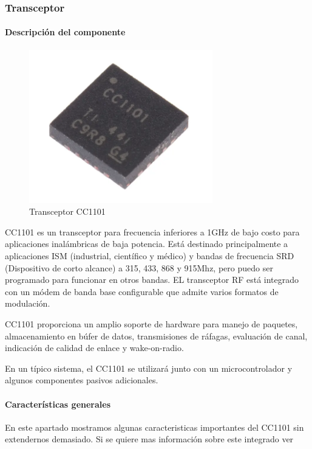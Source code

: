 \subsubsection{Transceptor}
\paragraph{Descripción del componente}


\begin{figure}[htb]
	\centering
	\includegraphics[scale=0.6]{images/CC1101.png}
    \caption{Transceptor CC1101}
	\label{fig:cc1101}
\end{figure}

CC1101 es un transceptor para frecuencia inferiores a 1GHz de bajo costo para aplicaciones inalámbricas de baja potencia. Está destinado principalmente
a aplicaciones ISM (industrial, científico y médico) y bandas de frecuencia SRD (Dispositivo de corto alcance) a 315, 433, 868 y 915Mhz, pero puedo ser programado 
para funcionar en otros bandas. EL transceptor RF está integrado con un módem de banda base configurable que admite varios formatos de modulación.\par 
CC1101 proporciona un amplio soporte de hardware para manejo de paquetes, almacenamiento en búfer de datos, transmisiones de ráfagas, evaluación de canal,
indicación de calidad de enlace y wake-on-radio. \par 
En un típico sistema, el CC1101 se utilizará junto con un microcontrolador y algunos componentes pasivos adicionales.

\paragraph{Características generales}

En este apartado mostramos algunas caracteristicas importantes del CC1101 sin extendernos demasiado. Si se quiere mas información sobre este integrado ver \todo 

